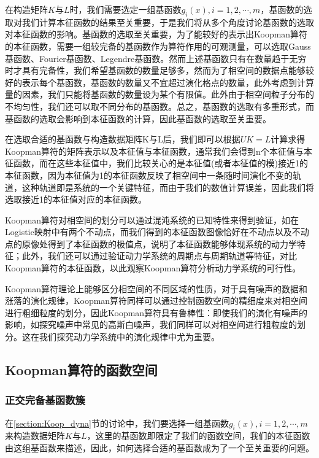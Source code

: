在构造矩阵$K$与$L$时，我们需要选定一组基函数${g_i(x)},i=1,2,\cdots,m$，基函数的选取对我们计算本征函数的结果至关重要，于是我们将从多个角度讨论基函数的选取对本征函数的影响。基函数的选取至关重要，为了能较好的表示出Koopman算符的本征函数，需要一组较完备的基函数作为算符作用的可观测量，可以选取Gauss基函数、Fourier基函数、Legendre基函数。然而上述基函数只有在数量趋于无穷时才具有完备性，我们希望基函数的数量足够多，然而为了相空间的数据点能够较好的表示每个基函数，基函数的数量又不宜超过演化格点的数量，此外考虑到计算量的因素，我们只能将基函数的数量设为某个有限值。此外由于相空间粒子分布的不均匀性，我们还可以取不同分布的基函数。总之，基函数的选取有多重形式，而基函数的选取会影响到本征函数的计算，因此基函数的选取至关重要。

在选取合适的基函数与构造数据矩阵K与L后，我们即可以根据$UK=L$计算求得Koopman算符的矩阵表示以及本征值与本征函数，通常我们会得到n个本征值与本征函数，而在这些本征值中，我们比较关心的是本征值(或者本征值的模)接近1的本征函数，因为本征值为1的本征函数反映了相空间中一条随时间演化不变的轨道，这种轨道即是系统的一个关键特征，而由于我们的数值计算误差，因此我们将选取接近1的本征值对应的本征函数。

Koopman算符对相空间的划分可以通过混沌系统的已知特性来得到验证，如在Logistic映射中有两个不动点，而我们得到的本征函数图像恰好在不动点以及不动点的原像处得到了本征函数的极值点，说明了本征函数能够体现系统的动力学特征；此外，我们还可以通过验证动力学系统的周期点与周期轨道等特征，对比Koopman算符的本征函数，以此观察Koopman算符分析动力学系统的可行性。

Koopman算符理论上能够区分相空间的不同区域的性质，对于具有噪声的数据和涨落的演化规律，Koopman算符同样可以通过控制函数空间的精细度来对相空间进行粗细粒度的划分，因此Koopman算符具有鲁棒性：即使我们的演化有噪声的影响，如探究噪声中常见的高斯白噪声，我们同样可以对相空间进行粗粒度的划分。这在我们探究动力学系统中的演化规律中尤为重要。

\subsection{Koopman算符的函数空间}
\subsubsection{正交完备基函数簇}
在\ref{section:Koop_dyna}节的讨论中，我们要选择一组基函数${g_i(x)},i=1,2,\cdots,m$来构造数据矩阵$K$与$L$，这里的基函数即限定了我们的函数空间，我们的本征函数由这组基函数来描述，因此，如何选择合适的基函数成为了一个至关重要的问题。

